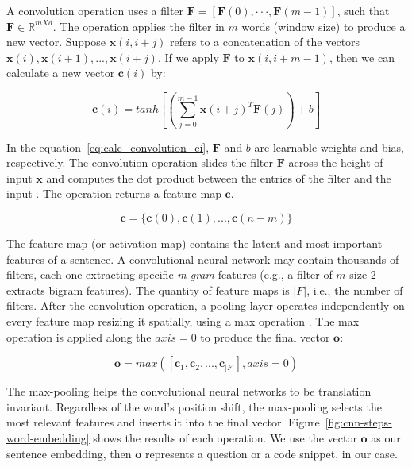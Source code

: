\documentclass[sigconf]{acmart}
\begin{document}
A convolution operation uses a filter $\bm{F}  = [\bm{F}(0),· · ·, \bm{F}(m - 1)]$, such that $\bm{F} \in \mathbb{R}^{m X d}$. The operation applies the filter in $m$ words (window size) to produce a new vector. Suppose $\bm{x}(i, i + j)$ refers to a concatenation of the vectors $\bm{x}(i), \bm{x}(i + 1), . . ., \bm{x}(i + j)$. If we apply $\bm{F}$ to $\bm{x}(i, i + m - 1)$, then we can calculate a new vector $\bm{c}(i)$ by:

\begin{equation}\label{eq:calc_convolution_ci}
    \bm{c}(i) = tanh \left[\left(\sum_{j=0}^{m - 1} \bm{x}(i + j)^{T}\bm{F}(j)\right) + b\right]
\end{equation}

In the equation~\ref{eq:calc_convolution_ci}, $\bm{F}$ and $b$ are learnable weights and bias, respectively. The convolution operation slides the filter $\bm{F}$ across the height of input $\bm{x}$ and computes the dot product between the entries of the filter and the input \cite{karpathy-course-cnn-2016}. The operation returns a feature map $\bm{c}$.

\begin{equation}
    \bm{c} = \{ \bm{c}(0), \bm{c}(1), . . ., \bm{c}(n - m) \} 
\end{equation}

The feature map (or activation map) contains the latent and most important features of a sentence. A convolutional neural network may contain thousands of filters, each one extracting specific \emph{m-gram} features (e.g., a filter of $m$ size 2 extracts bigram features). The quantity of feature maps is $|F|$, i.e., the number of filters. After the convolution operation, a pooling layer operates independently on every feature map resizing it spatially, using a max operation \cite{karpathy-course-cnn-2016}. The max operation is applied along the $axis=0$ to produce the final vector $\bm{o}$:

\begin{equation}
    \bm{o} = max\left(\left[\bm{c}_{1}, \bm{c}_{2}, . . ., \bm{c}_{|F|}\right], axis = 0\right)
\end{equation}

The max-pooling helps the convolutional neural networks to be translation invariant. Regardless of the word's position shift, the max-pooling selects the most relevant features and inserts it into the final vector. Figure~\ref{fig:cnn-steps-word-embedding} shows the results of each operation. We use the vector $\bm{o}$ as our sentence embedding, then $\bm{o}$ represents a question or a code snippet, in our case. 
\end{document}
